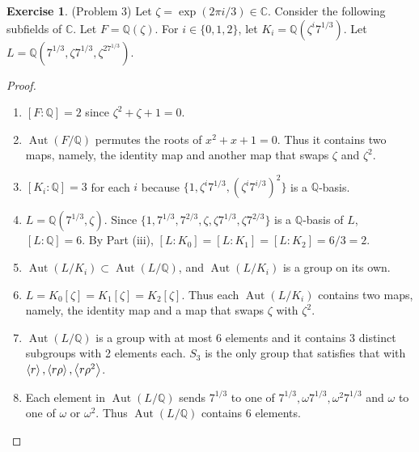 \documentclass[12pt, psamsfonts]{amsart}
\theoremstyle{definition}
\newtheorem*{exer}{Exercise}
\theoremstyle{remark}
\DeclareMathOperator{\Aut}{Aut}
\numberwithin{equation}{section}
\begin{document}
\begin{exer}{(Problem 3)}
  Let $\zeta = \exp(2\pi i / 3) \in \mathbb{C}$.
  Consider the following subfields of $\mathbb{C}$.
  Let $F = \mathbb{Q}(\zeta)$.
  For $i \in \{ 0, 1, 2 \}$, let $K_i = \mathbb{Q}(\zeta^i7^{1/3})$.
  Let $L = \mathbb{Q}(7^{1/3}, \zeta7^{1/3}, \zeta^27^{1/3})$.
\end{exer}

\begin{proof}
  $ $
  \begin{enumerate}
    \item 
      $[F:\mathbb{Q}] = 2$ since $\zeta^2 + \zeta + 1 = 0$.
    \item
      $\Aut(F/\mathbb{Q})$ permutes the roots of $x^2 + x + 1 = 0$.
      Thus it contains two maps, namely, the identity map and another map that swaps $\zeta$ and $\zeta^2$.
    \item
      $[K_i:\mathbb{Q}] = 3$ for each $i$ because $\{ 1, \zeta^i7^{1/3}, (\zeta^{i}7^{i/3})^2 \}$ is a $\mathbb{Q}$-basis.
    \item
      $L = \mathbb{Q}(7^{1/3}, \zeta)$.
      Since $\{ 1, 7^{1/3}, 7^{2/3}, \zeta, \zeta 7^{1/3}, \zeta 7^{2/3} \}$ is a $\mathbb{Q}$-basis of $L$, $[L:\mathbb{Q}] = 6$.
      By Part (iii), $[L:K_0] = [L:K_1] = [L:K_2] = 6 / 3 = 2$.
    \item
      $\Aut(L/K_i) \subset \Aut(L/\mathbb{Q})$, and $\Aut(L/K_i)$ is a group on its own.
    \item
      $L = K_0[\zeta] = K_1[\zeta] = K_2[\zeta]$.
      Thus each $\Aut(L/K_i)$ contains two maps, namely, the identity map and a map that swaps $\zeta$ with $\zeta^2$.
    \item
      $\Aut(L/\mathbb{Q})$ is a group with at most 6 elements and it contains 3 distinct subgroups with 2 elements each.
      $S_3$ is the only group that satisfies that with $\ev{ r }, \ev{ r\rho }, \ev{ r\rho^2 }$.
    \item
      Each element in $\Aut(L/\mathbb{Q})$ sends $7^{1/3}$ to one of $7^{1/3}, \omega 7^{1/3}, \omega^2 7^{1/3}$ and $\omega$ to one of $\omega$ or $\omega^2$.
      Thus $\Aut(L/\mathbb{Q})$ contains 6 elements.
  \end{enumerate}
\end{proof}
\end{document}

